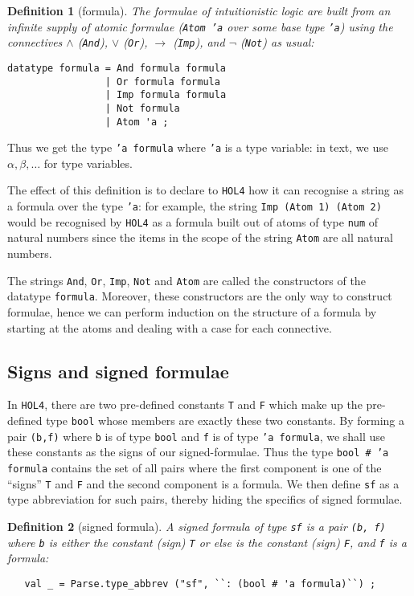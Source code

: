 \documentclass[a4paper]{article}
\newtheorem{definition}{Definition}
\newcommand{\hol}{\texttt{HOL4}}
\begin{document}
\begin{samepage}
\begin{definition}[formula]
 The formulae of intuitionistic logic are built from an infinite
 supply of atomic formulae (\texttt{Atom 'a} over some base type
 \texttt{'a})
 using the connectives
 $\land$ (\texttt{And}),
 $\lor$ (\texttt{Or}),
 $\to$ (\texttt{Imp}), and
 $\lnot$ (\texttt{Not}) as usual:
\begin{verbatim}
datatype formula = And formula formula
                 | Or formula formula
                 | Imp formula formula
                 | Not formula
                 | Atom 'a ;
\end{verbatim}
\end{definition}
\end{samepage}

Thus we get the type \texttt{'a formula} where \texttt{'a} is a type variable:
in text, we use $\alpha, \beta, \ldots$ for type variables.

The effect of this definition is to declare to \hol{} how it can
recognise a string as a formula over the type \texttt{'a}: for
example, the string \texttt{Imp (Atom 1) (Atom 2)} would be recognised
by \hol{} as a formula built out of atoms of type \texttt{num} of
natural numbers since the items in the scope of the string \texttt{Atom}
are all natural numbers.

The strings \texttt{And}, \texttt{Or}, \texttt{Imp}, \texttt{Not} and
\texttt{Atom} are called the constructors of the datatype
\texttt{formula}. Moreover, these constructors are the only way to
construct formulae, hence we can perform induction on the structure of
a formula by starting at the atoms and dealing with a case for each
connective. 

\subsection{Signs and signed formulae}

In \hol{}, there are two pre-defined constants \texttt{T} and
\texttt{F} which make up the pre-defined type \texttt{bool} whose
members are exactly these two constants. By forming a pair
\texttt{(b,f)} where \texttt{b} is of type \texttt{bool} and
\texttt{f} is of type \texttt{'a formula}, we shall use these
constants as the signs of our signed-formulae. Thus the type
\texttt{bool \# 'a formula} contains the set of all pairs where the
first component is one of the ``signs'' \texttt{T} and \texttt{F} and
the second component is a formula.  We then define \texttt{sf} as
a type abbreviation for such pairs, thereby hiding the specifics
of signed formulae.
\begin{definition}[signed formula]\label{def-signed-formula}
  A \emph{signed formula} of type
  \texttt{sf}
  is a pair \texttt{(b, f)} where
  \texttt{b} is either the constant (sign)
  \texttt{T} or else is the constant (sign)
  \texttt{F}, and 
  \texttt{f}
  is a formula:
\begin{verbatim}
   val _ = Parse.type_abbrev ("sf", ``: (bool # 'a formula)``) ;
\end{verbatim}
\end{definition}
\end{document}
